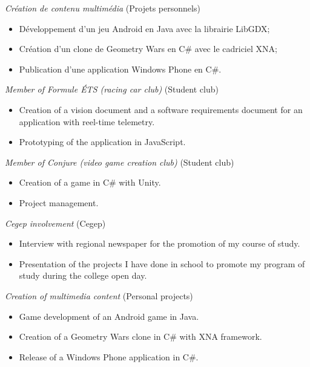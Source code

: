 \documentclass{res}
\newcommand{\inEnglish}[1]{#1}
\begin{document}
\begin{resume}
{	{\sl Création de contenu multimédia} \hfill (Projets personnels)
	\vspace{0.05in}
	\begin{itemize} \itemsep -2pt
		\item Développement d’un jeu Android en Java avec la librairie LibGDX;
		\item Création d’un clone de Geometry Wars en C\# avec le cadriciel XNA;
		\item Publication d’une application Windows Phone en C\#.
	\end{itemize}
}

\inEnglish{
	{\sl Member of Formule ÉTS (racing car club)} \hfill (Student club)
	\vspace{0.05in}
	\begin{itemize} \itemsep -2pt
		\item Creation of a vision document and a software requirements document for an application with reel-time telemetry.
		\item Prototyping of the application in JavaScript.
	\end{itemize}

	{\sl Member of Conjure (video game creation club)} \hfill (Student club)
	\vspace{0.05in}
	\begin{itemize} \itemsep -2pt
		\item Creation of a game in C\# with Unity.
		\item Project management.
	\end{itemize}

	{\sl Cegep involvement} \hfill (Cegep)
	\vspace{0.05in}
	\begin{itemize} \itemsep -2pt
		\item Interview with regional newspaper for the promotion of my course of study.
		\item Presentation of the projects I have done in school to promote my program of study during the college open day.
	\end{itemize}

	{\sl Creation of multimedia content} \hfill (Personal projects)
	\vspace{0.05in}
	\begin{itemize} \itemsep -2pt
		\item Game development of an Android game in Java.
		\item Creation of a Geometry Wars clone in C\# with XNA framework.
		\item Release of a Windows Phone application in C\#.
	\end{itemize}
}



\end{resume}
\end{document}
